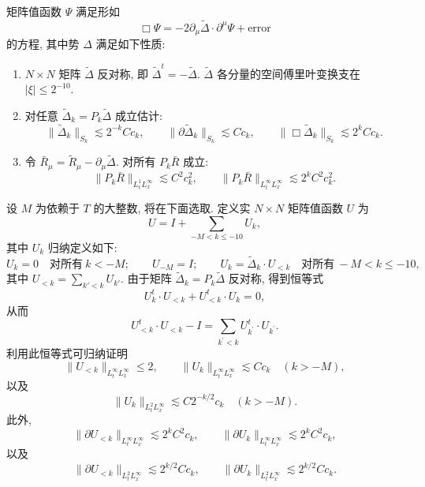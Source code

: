 \begin{proposition}\label{prop:2.27}
矩阵值函数 $\Psi$ 满足形如
\[
\Box\Psi=-2\partial_{\mu}\tilde{\Delta}\cdot\partial^{\mu}\Psi+\text{error}
\]
的方程, 其中势 $\Delta$ 满足如下性质:
\begin{enumerate}[label=\roman*.)]
\item $N \times N$ 矩阵 $\tilde{\Delta}$ 反对称, 即 $\tilde{\Delta}^t = -\tilde{\Delta}$. $\tilde{\Delta}$ 各分量的空间傅里叶变换支在 $|\xi| \leq 2^{-10}$.
\item 对任意 $\tilde{\Delta}_{k} = P_{k}\tilde{\Delta}$ 成立估计:
\[
\|\tilde{\Delta}_{k}\|_{S_{k}}\lesssim 2^{-k}C c_{k},\qquad
\|\partial\tilde{\Delta}_{k}\|_{S_{k}}\lesssim C c_{k},\qquad
\|\Box\tilde{\Delta}_{k}\|_{S_{k}}\lesssim2^{k}C c_{k}.
\]
\item 令 $\bar{R}_{\mu} = \tilde{R}_{\mu} - \partial_{\mu} \tilde{\Delta}$. 对所有 $P_{k} \bar{R}$ 成立:
\[
\|P_{k}\bar{R}\|_{L_{t}^{1}L_{x}^{\infty}}\lesssim C^{2}c_{k}^{2},\qquad
\|P_{k}\bar{R}\|_{L_{t}^{\infty}L_{x}^{\infty}}\lesssim 2^{k}C^{2}c_{k}^{2}.
\]
\end{enumerate}
\end{proposition}

设 $M$ 为依赖于 $T$ 的大整数, 将在下面选取. 定义实 $N \times N$ 矩阵值函数 $U$ 为
\[
U=I+\sum_{-M<k\leq-10}U_{k},
\]
其中 $U_{k}$ 归纳定义如下:
\[
U_{k}=0\quad\text{对所有}\ k<-M;\qquad U_{-M}=I;\qquad
U_{k}=\tilde{\Delta}_{k}\cdot U_{<k}\quad\text{对所有}\ -M<k\leq-10,
\]
其中 $U_{<k} = \sum_{k' < k} U_{k'}$. 由于矩阵 $\tilde{\Delta}_k = P_k\tilde{\Delta}$ 反对称, 得到恒等式
\[
U_{k}^{t}\cdot U_{<k}+U_{<k}^{t}\cdot U_{k}=0,
\]
从而
\[
U_{<k}^{t}\cdot U_{<k}-I=\sum_{k^{\prime}<k}U_{k^{\prime}}^{t}\cdot U_{k^{\prime}}.
\]
利用此恒等式可归纳证明
\[
\|U_{<k}\|_{L_{t}^{\infty}L_{x}^{\infty}}\leq 2,\qquad
\|U_{k}\|_{L_{t}^{\infty}L_{x}^{\infty}}\lesssim C c_{k}\quad (k>-M),
\]
以及
\[
\|U_{k}\|_{L_{t}^{2}L_{x}^{\infty}}\lesssim C2^{-k/2}c_{k}\quad (k>-M).
\]
此外,
\[
\|\partial U_{<k}\|_{L_{t}^{\infty}L_{x}^{\infty}}\lesssim 2^{k}C^{2}c_{k},\qquad
\|\partial U_{k}\|_{L_{t}^{\infty}L_{x}^{\infty}}\lesssim 2^{k}C^{2}c_{k},
\]
以及
\[
\|\partial U_{<k}\|_{L^{2}_{t} L^\infty_{x}}\lesssim 2^{k/2}C c_{k},\qquad
\|\partial U_{k}\|_{L^{2}_{t} L^\infty_{x}}\lesssim 2^{k/2}C c_{k}.
\]


